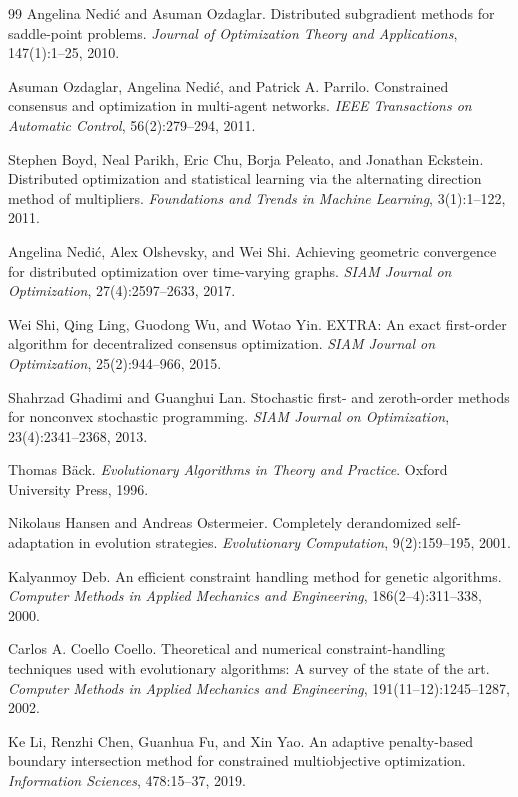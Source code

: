 \begin{titlepage}
\begin{thebibliography}{99}
Angelina Nedi\'c and Asuman Ozdaglar.
Distributed subgradient methods for saddle-point problems.
\emph{Journal of Optimization Theory and Applications}, 147(1):1--25, 2010.

Asuman Ozdaglar, Angelina Nedi\'c, and Patrick A. Parrilo.
Constrained consensus and optimization in multi-agent networks.
\emph{IEEE Transactions on Automatic Control}, 56(2):279--294, 2011.

Stephen Boyd, Neal Parikh, Eric Chu, Borja Peleato, and Jonathan Eckstein.
Distributed optimization and statistical learning via the alternating direction method of multipliers.
\emph{Foundations and Trends in Machine Learning}, 3(1):1--122, 2011.

Angelina Nedi\'c, Alex Olshevsky, and Wei Shi.
Achieving geometric convergence for distributed optimization over time-varying graphs.
\emph{SIAM Journal on Optimization}, 27(4):2597--2633, 2017.

Wei Shi, Qing Ling, Guodong Wu, and Wotao Yin.
EXTRA: An exact first-order algorithm for decentralized consensus optimization.
\emph{SIAM Journal on Optimization}, 25(2):944--966, 2015.

Shahrzad Ghadimi and Guanghui Lan.
Stochastic first- and zeroth-order methods for nonconvex stochastic programming.
\emph{SIAM Journal on Optimization}, 23(4):2341--2368, 2013.

Thomas B\"ack.
\emph{Evolutionary Algorithms in Theory and Practice}.
Oxford University Press, 1996.

Nikolaus Hansen and Andreas Ostermeier.
Completely derandomized self-adaptation in evolution strategies.
\emph{Evolutionary Computation}, 9(2):159--195, 2001.

Kalyanmoy Deb.
An efficient constraint handling method for genetic algorithms.
\emph{Computer Methods in Applied Mechanics and Engineering}, 186(2--4):311--338, 2000.

Carlos A. Coello Coello.
Theoretical and numerical constraint-handling techniques used with evolutionary algorithms:
A survey of the state of the art.
\emph{Computer Methods in Applied Mechanics and Engineering}, 191(11--12):1245--1287, 2002.

Ke Li, Renzhi Chen, Guanhua Fu, and Xin Yao.
An adaptive penalty-based boundary intersection method for constrained multiobjective optimization.
\emph{Information Sciences}, 478:15--37, 2019.


\end{thebibliography}
\end{titlepage}
